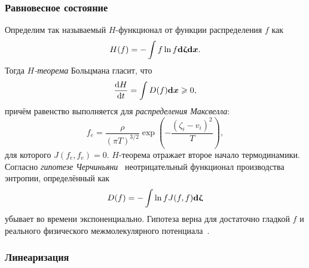 \subsubsection{Равновесное состояние}

Определим так называемый \(H\)-функционал от функции распределения \(f\) как
\begin{equation}\label{eq:H_function}
    H(f) = -\int f \ln f \dzeta \dx.
\end{equation}
Тогда \emph{\(H\)-теорема} Больцмана гласит, что
\begin{equation}\label{eq:H_theorem}
    \der[H]{t} = \int D(f) \dx \geq 0,
\end{equation}
причём равенство выполняется для \emph{распределения Максвелла}:
\begin{equation}\label{eq:Maxwell_distribution}
    f_e = \frac{\rho}{(\pi T)^{3/2}} \exp \left( -\frac{(\zeta_i-v_i)^2}{T} \right),
\end{equation}
для которого \(J(f_e,f_e) = 0\).
\(H\)-теорема отражает второе начало термодинамики.
Согласно \emph{гипотезе Черчиньяни}~\cite{Cercignani1982, Desvillettes2011} неотрицательный функционал
производства энтропии, определённый как
\begin{equation}\label{eq:D_function}
    D(f) = -\int \ln{f} J(f,f) \dzeta
\end{equation}
убывает во времени экспоненциально. Гипотеза верна для достаточно гладкой \(f\)
и реального физического межмолекулярного потенциала~\cite{Villani2003}.

\subsubsection{Линеаризация}

